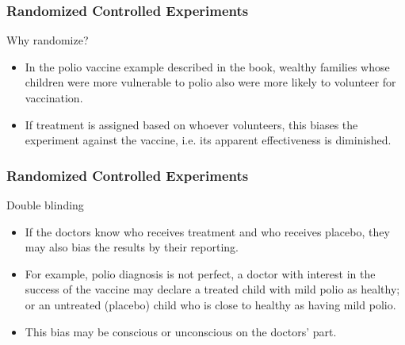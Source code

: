 \documentclass[handout]{beamer}
\begin{document}
   \begin{frame} \frametitle{Randomized Controlled Experiments}

   \begin{block}
   {Why randomize?}

   \begin{itemize}
   \item In the polio vaccine example described in the book, wealthy families whose children were more vulnerable to polio also were more likely to volunteer for vaccination.
   \item If treatment is assigned based on whoever volunteers, this biases the experiment against the vaccine, i.e. its apparent effectiveness is diminished.
   \end{itemize}

   \end{block}
   \end{frame}


   \begin{frame} \frametitle{Randomized Controlled Experiments}

   \begin{block}
   {Double blinding}
   \begin{itemize}
   \item  If the doctors know who receives treatment and who receives placebo, they may also bias the results by their reporting.
   \item For example, polio diagnosis is not perfect, a doctor with interest in the success of the vaccine may declare a treated child with mild polio as healthy; or an untreated (placebo) child who is close to healthy as having mild polio.
   \item This bias may be conscious or unconscious on the doctors' part.
   \end{itemize}

   \end{block}
   \end{frame}

\end{document}
